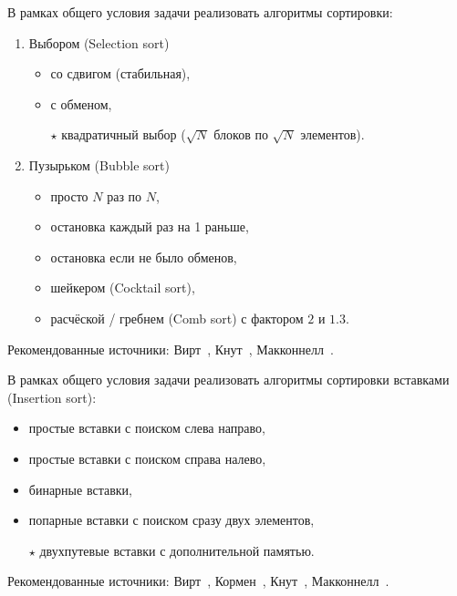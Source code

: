\begin{zztask}
В рамках общего условия задачи реализовать алгоритмы сортировки:
\begin{enumerate}
\item Выбором (Selection sort)
  \begin{itemize}[--]
  \item со сдвигом (стабильная),
  \item с обменом,
  \item[$\star$] квадратичный выбор ($\sqrt N$ блоков по $\sqrt N$ элементов).
  \end{itemize}
\item Пузырьком (Bubble sort)
  \begin{itemize}[--]
  \item просто $N$ раз по $N$,
  \item остановка каждый раз на 1 раньше,
  \item остановка если не было обменов,
  \item шейкером (Cocktail sort),
  \item расчёской / гребнем (Comb sort) с фактором $2$ и $1.3$.
  \end{itemize}
\end{enumerate}
%
Рекомендованные источники:
Вирт~\cite[\S2.2.2--2.2.3]{wirth2016algoritmy},
Кнут~\cite[\S5.2.2--5.2.3]{knuth2014iskusstvo},
Макконнелл~\cite[\S3.2]{mcconnel2009analyz}.
\end{zztask}


\begin{zztask}[Вставками]
В рамках общего условия задачи реализовать алгоритмы сортировки вставками (Insertion sort):
\begin{itemize}[--]
\item простые вставки с поиском слева направо,
\item простые вставки с поиском справа налево,
\item бинарные вставки,
\item попарные вставки с поиском сразу двух элементов,
\item[$\star$] двухпутевые вставки с дополнительной памятью.
\end{itemize}
%
Рекомендованные источники:
Вирт~\cite[\S2.2.1]{wirth2016algoritmy},
Кормен~\cite[\S1.1]{kormen2016algoritmy},
Кнут~\cite[\S5.2.1]{knuth2014iskusstvo},
Макконнелл~\cite[\S3.1]{mcconnel2009analyz}.
\end{zztask}

